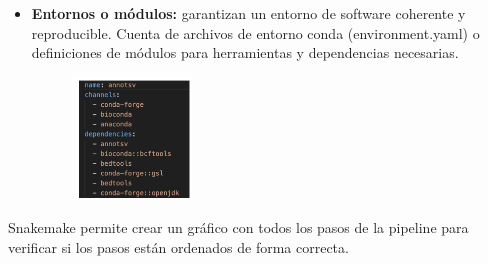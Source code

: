 \begin{itemize}
\item \textbf{Entornos o módulos:} garantizan un entorno de software coherente y reproducible. Cuenta de archivos de entorno conda (environment.yaml) o definiciones de módulos para herramientas y dependencias necesarias. 

\begin{figure}[htbp]
\centering
\includegraphics[width = 0.3\textwidth]{figs/snakemake-env.png}
\end{figure}
\end{itemize}

Snakemake permite crear un gráfico con todos los pasos de la pipeline para verificar si los pasos están ordenados de forma correcta.